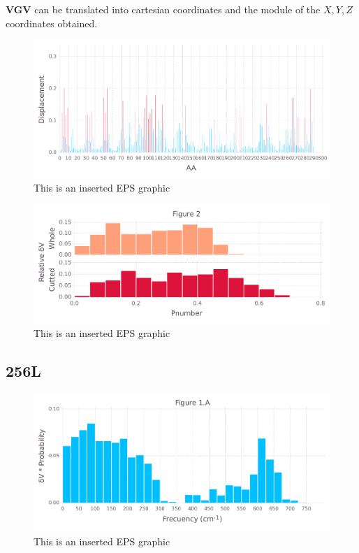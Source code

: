 \documentclass[10pt,letterpaper]{article}
\begin{document}
\FloatBarrier


\textbf{VGV} can be translated into cartesian coordinates and the module of the \(X, Y, Z\) coordinates obtained.

\begin{figure}[ht]
\begin{center}
\includegraphics[scale=0.5]{1prn/5figure.pdf}
\caption{This is an inserted EPS graphic}
\label{fig13}
\end{center}
\end{figure}

\begin{figure}[ht]
\begin{center}
\includegraphics[scale=0.5]{1prn/3_both.pdf}
\caption{This is an inserted EPS graphic}
\label{fig13}
\end{center}
\end{figure}

\FloatBarrier
\newpage

\subsection{256L}

\begin{figure}[ht]
\begin{center}
\includegraphics[scale=0.5]{256l/1afigure.pdf}
\caption{This is an inserted EPS graphic}
\label{fig1}
\end{center}
\end{figure}
\end{document}
